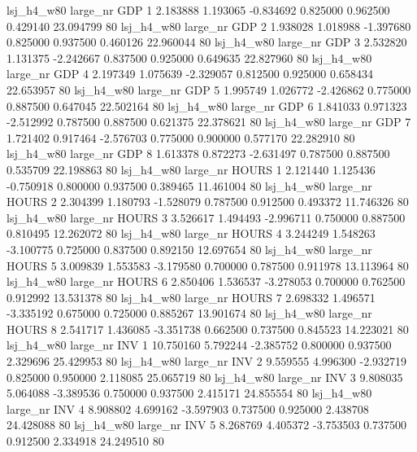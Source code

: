   lsj_h4_w80   large_nr      GDP                 1  2.183888  1.193065  -0.834692 0.825000 0.962500  0.429140   23.094799 80
  lsj_h4_w80   large_nr      GDP                 2  1.938028  1.018988  -1.397680 0.825000 0.937500  0.460126   22.960044 80
  lsj_h4_w80   large_nr      GDP                 3  2.532820  1.131375  -2.242667 0.837500 0.925000  0.649635   22.827960 80
  lsj_h4_w80   large_nr      GDP                 4  2.197349  1.075639  -2.329057 0.812500 0.925000  0.658434   22.653957 80
  lsj_h4_w80   large_nr      GDP                 5  1.995749  1.026772  -2.426862 0.775000 0.887500  0.647045   22.502164 80
  lsj_h4_w80   large_nr      GDP                 6  1.841033  0.971323  -2.512992 0.787500 0.887500  0.621375   22.378621 80
  lsj_h4_w80   large_nr      GDP                 7  1.721402  0.917464  -2.576703 0.775000 0.900000  0.577170   22.282910 80
  lsj_h4_w80   large_nr      GDP                 8  1.613378  0.872273  -2.631497 0.787500 0.887500  0.535709   22.198863 80
  lsj_h4_w80   large_nr    HOURS                 1  2.121440  1.125436  -0.750918 0.800000 0.937500  0.389465   11.461004 80
  lsj_h4_w80   large_nr    HOURS                 2  2.304399  1.180793  -1.528079 0.787500 0.912500  0.493372   11.746326 80
  lsj_h4_w80   large_nr    HOURS                 3  3.526617  1.494493  -2.996711 0.750000 0.887500  0.810495   12.262072 80
  lsj_h4_w80   large_nr    HOURS                 4  3.244249  1.548263  -3.100775 0.725000 0.837500  0.892150   12.697654 80
  lsj_h4_w80   large_nr    HOURS                 5  3.009839  1.553583  -3.179580 0.700000 0.787500  0.911978   13.113964 80
  lsj_h4_w80   large_nr    HOURS                 6  2.850406  1.536537  -3.278053 0.700000 0.762500  0.912992   13.531378 80
  lsj_h4_w80   large_nr    HOURS                 7  2.698332  1.496571  -3.335192 0.675000 0.725000  0.885267   13.901674 80
  lsj_h4_w80   large_nr    HOURS                 8  2.541717  1.436085  -3.351738 0.662500 0.737500  0.845523   14.223021 80
  lsj_h4_w80   large_nr      INV                 1 10.750160  5.792244  -2.385752 0.800000 0.937500  2.329696   25.429953 80
  lsj_h4_w80   large_nr      INV                 2  9.559555  4.996300  -2.932719 0.825000 0.950000  2.118085   25.065719 80
  lsj_h4_w80   large_nr      INV                 3  9.808035  5.064088  -3.389536 0.750000 0.937500  2.415171   24.855554 80
  lsj_h4_w80   large_nr      INV                 4  8.908802  4.699162  -3.597903 0.737500 0.925000  2.438708   24.428088 80
  lsj_h4_w80   large_nr      INV                 5  8.268769  4.405372  -3.753503 0.737500 0.912500  2.334918   24.249510 80
